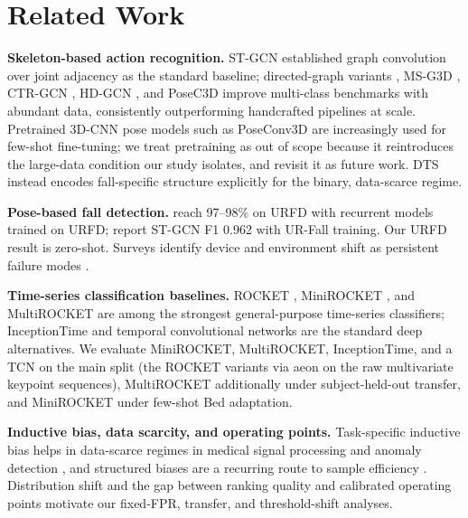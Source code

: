\section{Related Work}
\textbf{Skeleton-based action recognition.} ST-GCN \citep{yan2018stgcn} established graph convolution over joint adjacency as the standard baseline; directed-graph variants \citep{shi2019directed}, MS-G3D \citep{liu2020msg3d}, CTR-GCN \citep{chen2021ctrgcn}, HD-GCN \citep{lee2023hdgcn}, and PoseC3D \citep{duan2022posec3d} improve multi-class benchmarks with abundant data, consistently outperforming handcrafted pipelines at scale. Pretrained 3D-CNN pose models such as PoseConv3D are increasingly used for few-shot fine-tuning; we treat pretraining as out of scope because it reintroduces the large-data condition our study isolates, and revisit it as future work. DTS instead encodes fall-specific structure explicitly for the binary, data-scarce regime.

\textbf{Pose-based fall detection.} \citet{lin2021robot} reach 97--98\% on URFD with recurrent models trained on URFD; \citet{zhu2025fall} report ST-GCN F1 0.962 with UR-Fall training. Our URFD result is zero-shot. Surveys identify device and environment shift as persistent failure modes \citep{igual2013challenges,mubashir2013survey,demiguel2017home}.

\textbf{Time-series classification baselines.} ROCKET \citep{dempster2020rocket}, MiniROCKET \citep{dempster2021minirocket}, and MultiROCKET \citep{tan2022multirocket} are among the strongest general-purpose time-series classifiers; InceptionTime \citep{fawaz2020inceptiontime} and temporal convolutional networks \citep{bai2018tcn} are the standard deep alternatives. We evaluate MiniROCKET, MultiROCKET, InceptionTime, and a TCN on the main split (the ROCKET variants via aeon \citep{middlehurst2024aeon} on the raw multivariate keypoint sequences), MultiROCKET additionally under subject-held-out transfer, and MiniROCKET under few-shot Bed adaptation.

\textbf{Inductive bias, data scarcity, and operating points.} Task-specific inductive bias helps in data-scarce regimes in medical signal processing \citep{rajpurkar2017cardiologist} and anomaly detection \citep{pang2021anomaly}, and structured biases are a recurring route to sample efficiency \citep{battaglia2018relational}. Distribution shift and the gap between ranking quality and calibrated operating points \citep{guo2017calibration,gulrajani2021domain} motivate our fixed-FPR, transfer, and threshold-shift analyses.

